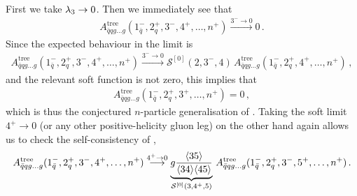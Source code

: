 First we take $\lambda_{3}\to 0$. Then we immediately see that
\begin{align}
A_{\bar{q}qg\ldots g}^{\text{tree}}(1_{\bar q}^{-}, 2_{q}^{+}, 3^{-}, 4^{+},\ldots, n^{+}) \stackrel{3^{-}\to 0}{\longrightarrow}  0 \,.
\end{align}
Since the expected behaviour in the limit is
\begin{align}
A_{\bar{q}qg\ldots g}^{\text{tree}}(1_{\bar q}^{-}, 2_{q}^{+}, 3^{-}, 4^{+},\ldots, n^{+})  \stackrel{3^{-}\to 0}{\longrightarrow} \mathcal{S}^{[0]}(2,3^{-},4)\,  
A_{\bar{q}qg\ldots g}^{\text{tree}}(1_{\bar q}^{-}, 2_{q}^{+}, 4^{+}, \ldots, n^{+}) \, ,
\end{align}
and the relevant soft function is not zero, this implies that 
\begin{align}
A_{\bar{q}qg\ldots g}^{\text{tree}}(1_{\bar q}^{-}, 2_{q}^{+}, 3^{+}, \ldots, n^{+}) = 0 \,,
\end{align}
which is thus the conjectured $n$-particle generalisation of . 
Taking the soft limit $4^{+}\to 0$ (or any other positive-helicity gluon leg) on the other hand again allows us to check the self-consistency of ,
\begin{align}
A_{\bar{q}qg\ldots g}^{\text{tree}}(1_{\bar q}^{-}, 2_{q}^{+}, 3^{-}, 4^{+}, \ldots, n^{+}) \stackrel{4^{+}\to 0}{\longrightarrow} 
\underbrace{g \frac{\langle35\rangle}{\langle34\rangle\langle45\rangle}}_{\mathcal{S}^{[0]}(3,4^{+},5)}\, A_{\bar{q}qg\ldots g}^{\text{tree}}(1_{\bar q}^{-}, 2_{q}^{+}, 3^{-}, 
5^{+}, \ldots, n^{+}) \, .
\end{align}


